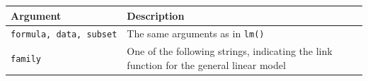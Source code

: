 \documentclass[]{book}
\theoremstyle{definition}
\theoremstyle{definition}
\theoremstyle{remark}
\begin{document}
\begin{longtable}[]{@{}ll@{}}
\toprule
\begin{minipage}[b]{0.18\columnwidth}\raggedright\strut
Argument\strut
\end{minipage} & \begin{minipage}[b]{0.67\columnwidth}\raggedright\strut
Description\strut
\end{minipage}\tabularnewline
\midrule
\endhead
\begin{minipage}[t]{0.18\columnwidth}\raggedright\strut
\texttt{formula,\ data,\ subset}\strut
\end{minipage} & \begin{minipage}[t]{0.67\columnwidth}\raggedright\strut
The same arguments as in \texttt{lm()}\strut
\end{minipage}\tabularnewline
\begin{minipage}[t]{0.18\columnwidth}\raggedright\strut
\texttt{family}\strut
\end{minipage} & \begin{minipage}[t]{0.67\columnwidth}\raggedright\strut
One of the following strings, indicating the link function for the
general linear model\strut
\end{minipage}\tabularnewline
\bottomrule
\end{longtable}
\end{document}
